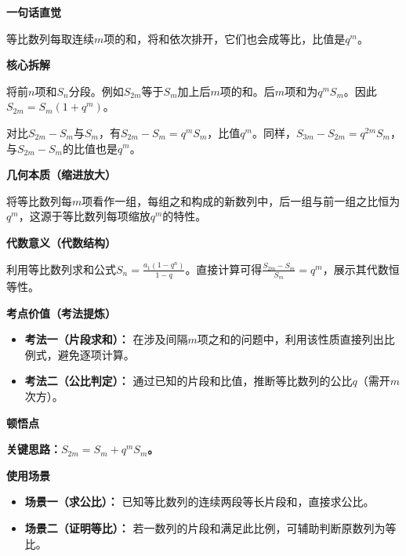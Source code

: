 \begin{explanationbox}
	\textbf{\textcolor{CExplanation}{一句话直觉}}

	等比数列每取连续$m$项的和，将和依次排开，它们也会成等比，比值是$q^m$。

	\medskip
	\textbf{\textcolor{CExplanation}{核心拆解}}
	\begin{description}[style=nextline, leftmargin=2.8em, labelsep=0.5em, itemsep=0.45em]
		\item[\textbf{要点一（片段和拆分）：}] 将前$n$项和$S_n$分段。例如$S_{2m}$等于$S_m$加上后$m$项的和。后$m$项和为$q^mS_m$。因此$S_{2m}=S_m(1+q^m)$。
		\item[\textbf{要点二（公比来源）：}] 对比$S_{2m}-S_m$与$S_m$，有$S_{2m}-S_m=q^mS_m$，比值$q^m$。同样，$S_{3m}-S_{2m}=q^{2m}S_m$，与$S_{2m}-S_m$的比值也是$q^m$。
	\end{description}

	\medskip
	\textbf{\textcolor{CExplanation}{几何本质（缩进放大）}}

	将等比数列每$m$项看作一组，每组之和构成的新数列中，后一组与前一组之比恒为$q^m$，这源于等比数列每项缩放$q^m$的特性。

	\medskip
	\textbf{\textcolor{CExplanation}{代数意义（代数结构）}}

	利用等比数列求和公式$S_n=\frac{a_1(1-q^n)}{1-q}$。直接计算可得$\frac{S_{2m}-S_m}{S_m}=q^m$，展示其代数恒等性。

	\medskip
	\textbf{\textcolor{CExplanation}{考点价值（考法提炼）}}
	\begin{itemize}[leftmargin=*, itemsep=0.5em, topsep=0.4em]
		\item \textbf{考法一（片段求和）：} 在涉及间隔$m$项之和的问题中，利用该性质直接列出比例式，避免逐项计算。
		\item \textbf{考法二（公比判定）：} 通过已知的片段和比值，推断等比数列的公比$q$（需开$m$次方）。
	\end{itemize}

	\medskip
	\textbf{\textcolor{CExplanation}{顿悟点}}

	\textbf{关键思路：$S_{2m}=S_m+q^mS_m$。}

	\medskip
	\textbf{\textcolor{CExplanation}{使用场景}}
	\begin{itemize}[leftmargin=*, itemsep=0.5em, topsep=0.4em]
		\item \textbf{场景一（求公比）：} 已知等比数列的连续两段等长片段和，直接求公比。
		\item \textbf{场景二（证明等比）：} 若一数列的片段和满足此比例，可辅助判断原数列为等比。
	\end{itemize}
\end{explanationbox}
